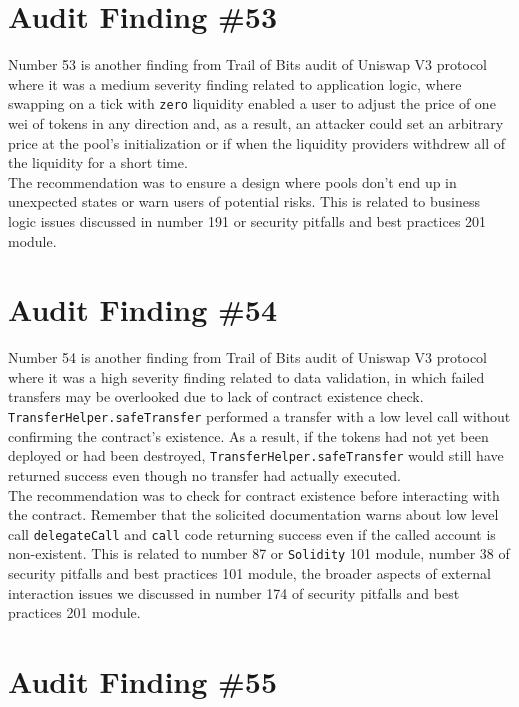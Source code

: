 \section{Audit Finding \#53}

Number 53 is another finding from Trail of Bits audit of Uniswap V3 protocol where it was a medium severity finding related to application logic, where swapping on a tick with \verb|zero| liquidity enabled a user to adjust the price of one wei of tokens in any direction and, as a result, an attacker could set an arbitrary price at the pool's initialization or if when the liquidity providers withdrew all of the liquidity for a short time.\\

The recommendation was to ensure a design where pools don't end up in unexpected states or warn users of potential risks. This is related to business logic issues discussed in number 191 or security pitfalls and best practices 201 module.

\section{Audit Finding \#54}

Number 54 is another finding from Trail of Bits audit of Uniswap V3 protocol where it was a high severity finding related to data validation, in which failed transfers may be overlooked due to lack of contract existence check. \verb|TransferHelper.safeTransfer| performed a transfer with a low level call without confirming the contract's existence. As a result, if the tokens had not yet been deployed or had been destroyed,  \verb|TransferHelper.safeTransfer| would still have returned success even though no transfer had actually executed.\\

The recommendation was to check for contract existence before interacting with the contract. Remember that the solicited documentation warns about low level call \verb|delegateCall| and \verb|call| code returning success even if the called account is non-existent. This is related to number 87 or \verb|Solidity| 101 module, number 38 of security pitfalls and best practices 101 module, the broader aspects of external interaction issues we discussed in number 174 of security pitfalls and best practices 201 module.

\section{Audit Finding \#55}

